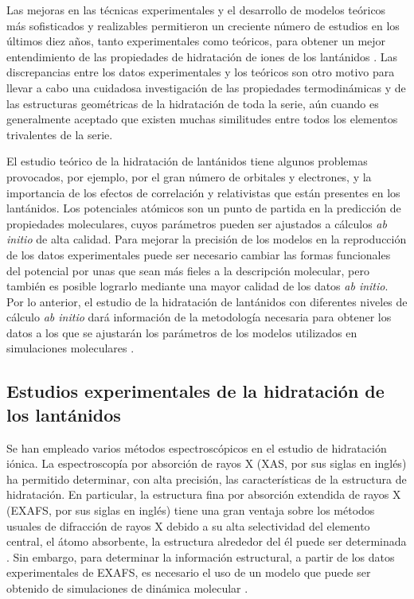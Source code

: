 Las mejoras en las t\'ecnicas experimentales y el desarrollo de 
modelos te\'oricos m\'as sofisticados y realizables permitieron un 
creciente n\'umero de estudios en los \'ultimos diez a\~nos, tanto 
experimentales como te\'oricos, para obtener un mejor entendimiento 
de las propiedades de hidrataci\'on de iones de los lant\'anidos 
\citep{Dang2012}. Las discrepancias entre los datos experimentales
y los te\'oricos son otro motivo para llevar a cabo una cuidadosa 
investigaci\'on de las propiedades termodin\'amicas y de las 
estructuras geom\'etricas de la hidrataci\'on de toda la serie, a\'un 
cuando es generalmente aceptado que existen muchas similitudes entre
todos los elementos trivalentes de la serie.

El estudio te\'orico de la hidrataci\'on de lant\'anidos tiene 
algunos problemas provocados, por ejemplo, por el gran n\'umero de
orbitales y electrones, y la importancia de los efectos de 
correlaci\'on y relativistas que est\'an presentes en los 
lant\'anidos. Los potenciales at\'omicos son un punto de partida en 
la predicci\'on de propiedades moleculares, cuyos par\'ametros pueden
ser ajustados a c\'alculos {\it ab initio} de alta calidad. Para 
mejorar la precisi\'on de los modelos en la reproducci\'on de los 
datos experimentales puede ser necesario cambiar las formas 
funcionales del potencial por unas que sean m\'as fieles a la 
descripci\'on molecular, pero tambi\'en es posible lograrlo mediante
una mayor calidad de los datos {\it ab initio}. Por
lo anterior, el estudio de la hidrataci\'on de lant\'anidos con 
diferentes niveles de c\'alculo {\it ab initio} dar\'a informaci\'on
de la metodolog\'ia necesaria para obtener los datos a los que se
ajustar\'an los par\'ametros de los modelos utilizados en
simulaciones moleculares 	\citep{Cund1993,Sadu1999,Hern2005}.

\subsection{Estudios experimentales de la hidrataci\'on de los 
lant\'anidos}
Se han empleado varios m\'etodos espectrosc\'opicos en el estudio de
hidrataci\'on i\'onica. La espectroscop\'ia por absorci\'on de rayos 
X (XAS, por sus siglas en ingl\'es) ha permitido determinar, con 
alta precisi\'on, las caracter\'isticas de la estructura de 
hidrataci\'on. En particular, la estructura fina por absorci\'on 
extendida de rayos X (EXAFS, por sus siglas en ingl\'es) tiene una 
gran ventaja sobre los m\'etodos usuales de difracci\'on de rayos X 
debido a su alta selectividad del elemento central, el \'atomo 
absorbente, la estructura alrededor del \'el puede ser determinada
\citep{Ohta1993}. Sin embargo, para determinar la informaci\'on 
estructural, a partir de los datos experimentales de EXAFS, es 
necesario el uso de un modelo que puede ser obtenido de simulaciones 
de din\'amica molecular \citep{Dang2011}. 


